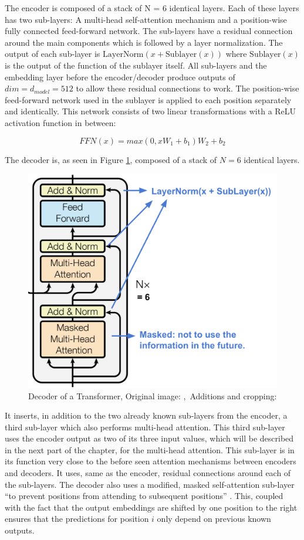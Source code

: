 \documentclass[]{krantz}
\begin{document}
The encoder is composed of a stack of N = 6 identical layers. Each of these layers
has two sub-layers: A multi-head self-attention mechanism and a position-wise fully
connected feed-forward network. The sub-layers have a residual connection around
the main components which is followed by a layer normalization. The output of each sub-layer
is \(\text{LayerNorm}(x + \text{Sublayer}(x))\) where \(\text{Sublayer}(x)\) is the output of the
function of the sublayer itself. All sub-layers and the embedding layer before the
encoder/decoder produce outputs of \(dim = d_{model} = 512\) to allow these residual connections to work.
The position-wise feed-forward network used in the sublayer is applied to each position
separately and identically. This network consists of two linear transformations with
a ReLU activation function in between:

\[
FFN(x) = max(0, xW_1 + b_1)W_2 + b_2
\]

The decoder is, as seen in Figure \ref{fig:decoder-transformer}, composed of a stack of \(N = 6\) identical layers.

\begin{figure}

{\centering \includegraphics[width=0.5\linewidth]{figures/02-02-attention-and-self-attention-for-nlp/transformer-decoder} 

}

\caption{Decoder of a Transformer, Original image: \citep{vaswani2017attention},\ Additions and cropping: \citep{weng2018attention}}\label{fig:decoder-transformer}
\end{figure}

It inserts, in addition to the two already known sub-layers from the encoder,
a third sub-layer which also performs multi-head attention.
This third sub-layer uses the encoder output as two of its three input values, which will be described in the next part of the chapter,
for the multi-head attention. This sub-layer is in its function very close to the before seen attention mechanisms between encoders and decoders.
It uses, same as the encoder, residual connections around each of the sub-layers.
The decoder also uses a modified, masked self-attention sub-layer ``to prevent positions
from attending to subsequent positions'' \citet{vaswani2017attention}. This, coupled with the
fact that the output embeddings are shifted by one position to the right ensures that
the predictions for position \(i\) only depend on previous known outputs.
\end{document}
